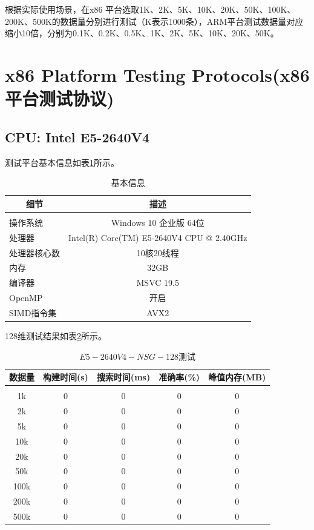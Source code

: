 \documentclass[a4paper, 11pt, UTF8]{ctexart}%
\begin{document}
根据实际使用场景，在x86 平台选取1K、2K、5K、10K、20K、50K、100K、200K、500K的数据量分别进行测试（K表示1000条），ARM平台测试数据量对应缩小10倍，分别为0.1K、0.2K、0.5K、1K、2K、5K、10K、20K、50K。
\section{x86 Platform Testing Protocols(x86 平台测试协议)}
\subsection{CPU: Intel E5-2640V4}
测试平台基本信息如表\ref{tab:basic-info-E5-2640V4}所示。
\begin{table}[H]
\caption{基本信息}
\label{tab:basic-info-E5-2640V4}
\begin{center}
\begin{tabular}{lc}
\multicolumn{1}{c}{\bf 细节}  &\multicolumn{1}{c}{\bf 描述}
\\ \hline \\
操作系统         &Windows 10 企业版 64位 \\
处理器           &Intel(R) Core(TM) E5-2640V4 CPU @ 2.40GHz \\
处理器核心数     &10核20线程 \\
内存             &32GB \\
编译器           &MSVC 19.5 \\
OpenMP           &开启 \\
SIMD指令集       &AVX2 \\
\end{tabular}
\end{center}
\end{table}


128维测试结果如表\ref{tab:E5-2640V4-NSG-128}所示。
\begin{table}[H]
\caption{$E5-2640V4-NSG-128$测试}
\label{tab:E5-2640V4-NSG-128}
\begin{center}
\begin{tabular}{ccccc}
\multicolumn{1}{c}{\bf 数据量}  &\multicolumn{1}{c}{\bf 构建时间(s)}  &\multicolumn{1}{c}{\bf 搜索时间(ms)}  &\multicolumn{1}{c}{\bf 准确率(\%)}  &\multicolumn{1}{c}{\bf 峰值内存(MB)}
\\ \hline \\
1k & 0 & 0 & 0 & 0\\
2k & 0 & 0 & 0 & 0\\
5k & 0 & 0 & 0 & 0\\
10k & 0 & 0 & 0 & 0\\
20k & 0 & 0 & 0 & 0\\
50k & 0 & 0 & 0 & 0\\
100k & 0 & 0 & 0 & 0\\
200k & 0 & 0 & 0 & 0\\
500k & 0 & 0 & 0 & 0\\
\end{tabular}
\end{center}
\end{table}
\end{document}
